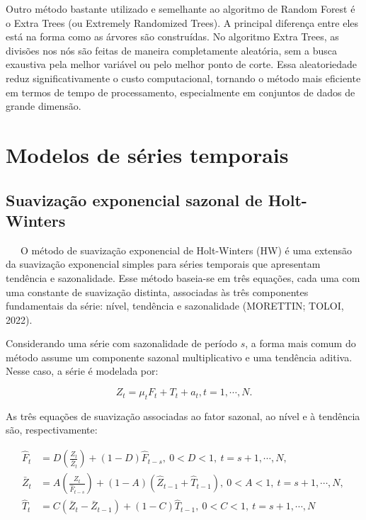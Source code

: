 \documentclass[
  12pt,
  a4paper,
]{scrreprt}
\begin{document}
\vspace{12pt}

Outro método bastante utilizado e semelhante ao algoritmo de Random
Forest é o Extra Trees (ou Extremely Randomized Trees). A principal
diferença entre eles está na forma como as árvores são construídas. No
algoritmo Extra Trees, as divisões nos nós são feitas de maneira
completamente aleatória, sem a busca exaustiva pela melhor variável ou
pelo melhor ponto de corte. Essa aleatoriedade reduz significativamente
o custo computacional, tornando o método mais eficiente em termos de
tempo de processamento, especialmente em conjuntos de dados de grande
dimensão.

\section{Modelos de séries
temporais}\label{modelos-de-suxe9ries-temporais}

\subsection{Suavização exponencial sazonal de
Holt-Winters}\label{suavizauxe7uxe3o-exponencial-sazonal-de-holt-winters}

~~~O método de suavização exponencial de Holt-Winters (HW) é uma
extensão da suavização exponencial simples para séries temporais que
apresentam tendência e sazonalidade. Esse método baseia-se em três
equações, cada uma com uma constante de suavização distinta, associadas
às três componentes fundamentais da série: nível, tendência e
sazonalidade (MORETTIN; TOLOI, 2022).

\vspace{12pt}

Considerando uma série com sazonalidade de período \(s\), a forma mais
comum do método assume um componente sazonal multiplicativo e uma
tendência aditiva. Nesse caso, a série é modelada por:

\[
Z_t = \mu_{t} F_{t} + T_{t} + a_{t}, t = 1, \cdots, N.
\]

As três equações de suavização associadas ao fator sazonal, ao nível e à
tendência são, respectivamente:

\[
\begin{aligned}
\hat{F}_{t} &= D \left(\frac{Z_{t}}{\bar{Z}_{t}}\right) + \left(1 - D\right) \hat{F}_{t-s}, \ 0 < D< 1, \ t = s + 1, \cdots, N \text{, } \\
\bar{Z}_{t} &= A \left(\frac{Z_{t}}{\hat{F}_{t-s}}\right) + \left(1 - A\right)\left(\hat{Z}_{t-1} + \hat{T}_{t-1}\right), \ 0<A<1, \ t = s+1,\cdots, N \text{, } \\
\hat{T}_{t} &= C\left(\bar{Z}_{t} - \bar{Z}_{t -1}\right) + \left(1 - C\right)\hat{T}_{t - 1}, \ 0< C <1, \ t=s+1, \cdots, N
\end{aligned}
\]
\end{document}
